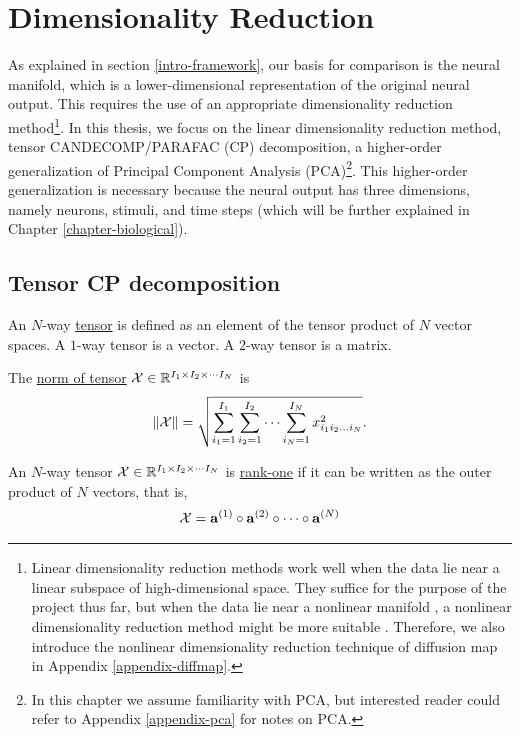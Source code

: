 \chapter{Dimensionality Reduction} 
\label{chapter-linear} 

As explained in section \ref{intro-framework}, our basis for comparison is the neural manifold, which is a lower-dimensional representation of the original neural output. This requires the use of an appropriate dimensionality reduction method\footnote{Linear dimensionality reduction methods work well when the data lie near a linear subspace of high-dimensional space. They suffice for the purpose of the project thus far, but when the data lie near a nonlinear manifold , a nonlinear dimensionality reduction method might be more suitable \cite{fefferman_testing_2016}. Therefore, we also introduce the nonlinear dimensionality reduction technique of diffusion map in Appendix \ref{appendix-diffmap}.}. In this thesis, we focus on the linear dimensionality reduction method, tensor CANDECOMP/PARAFAC (CP) decomposition, a higher-order generalization of Principal Component Analysis (PCA)\footnote{In this chapter we assume familiarity with PCA, but interested reader could refer to Appendix \ref{appendix-pca} for notes on PCA.}. This higher-order generalization is necessary because the neural output has three dimensions, namely neurons, stimuli, and time steps (which will be further explained in Chapter \ref{chapter-biological}). 

\section{Tensor CP decomposition}
\begin{defn}[Tensor]
    An $N$-way \underline{tensor} is defined as an element of the tensor product of $N$ vector spaces. A $1$-way tensor is a vector. A $2$-way tensor is a matrix.
    \end{defn}

\begin{defn}
The \underline{norm of tensor} $\mathcal{X} \in \mathbb R^{I_1 \times I_2\times\cdots I_N}$ is
\begin{align}
    \left\lVert\mathcal{X}\right\rVert = \sqrt{\sum_{i_1 = 1}^{I_1}\sum_{i_2 = 1}^{I_2}\cdots \sum_{i_N = 1}^{I_N} x_{i_1 i_2 \dots i_N}^2 }.
\end{align}
\end{defn}
\begin{defn}
An $N$-way tensor $\mathcal{X} \in \mathbb R^{I_1 \times I_2\times\cdots I_N}$ is \underline{rank-one} if it can be written as the outer product of $N$ vectors, that is,
\begin{align}
    \mathcal{X} = \mathbf{a}^{(1)}\circ \mathbf{a}^{(2)} \circ \cdots \circ \mathbf{a}^{(N)}
\end{align}
\end{defn}

